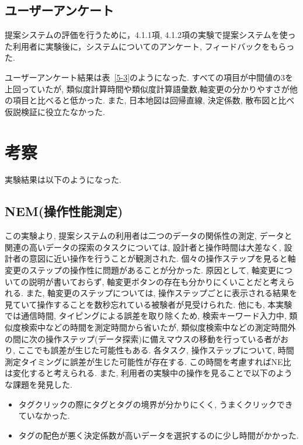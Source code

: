 \documentclass[sotsuron]{kuee}
\begin{document}
\subsection{ユーザーアンケート}

提案システムの評価を行うために，4.1.1項, 4.1.2項の実験で提案システムを使った利用者に実験後に，システムについてのアンケート, フィードバックをもらった.

ユーザーアンケート結果は表~\ref{5-3}のようになった.
すべての項目が中間値の3を上回っていたが, 類似度計算時間や類似度計算語彙数,軸変更の分かりやすさが他の項目と比べると低かった.
また, 日本地図は回帰直線, 決定係数, 散布図と比べ仮説検証に役立たなかった.

\section{考察}

実験結果は以下のようになった.

\subsection{NEM(操作性能測定)}

この実験より, 提案システムの利用者は二つのデータの関係性の測定, データと関連の高いデータの探索のタスクについては,
設計者と操作時間は大差なく, 設計者の意図に近い操作を行うことが観測された.
個々の操作ステップを見ると軸変更のステップの操作性に問題があることが分かった.
原因として, 軸変更についての説明が書いておらず, 軸変更ボタンの存在も分かりにくいことだと考えられる.
また, 軸変更のステップについては, 操作ステップごとに表示される結果を見ていて操作することを数秒忘れている被験者が見受けられた.
他にも, 本実験では通信時間, タイピングによる誤差を取り除くため, 検索キーワード入力中, 類似度検索中などの時間を測定時間から省いたが,
類似度検索中などの測定時間外の間に次の操作ステップ(データ探索)に備えマウスの移動を行っている者がおり, ここでも誤差が生じた可能性もある.
各タスク, 操作ステップについて, 時間測定タイミングに誤差が生じた可能性が存在する.
この時間を考慮すればNE比は変化すると考えられる.
また, 利用者の実験中の操作を見ることで以下のような課題を発見した.

\begin{itemize}
 \item タグクリックの際にタグとタグの境界が分かりにくく, うまくクリックできていなかった.
 \item タグの配色が悪く決定係数が高いデータを選択するのに少し時間がかかった.
\end{itemize}
\end{document}
